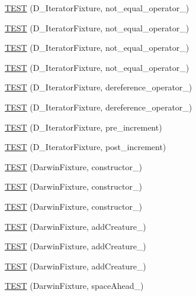 \begin{DoxyCompactItemize}
\hyperlink{TestDarwin_8c_09_09_a4ca9631924332f91c3eac38752aa2dbb}{T\-E\-S\-T} (D\-\_\-\-Iterator\-Fixture, not\-\_\-equal\-\_\-operator\-\_)
\item 
\hyperlink{TestDarwin_8c_09_09_afb0e646400ec1f41bac68701ca5c768e}{T\-E\-S\-T} (D\-\_\-\-Iterator\-Fixture, not\-\_\-equal\-\_\-operator\-\_)
\item 
\hyperlink{TestDarwin_8c_09_09_a0cf6e116e3a363d2aa2fa55cd4ae3d19}{T\-E\-S\-T} (D\-\_\-\-Iterator\-Fixture, not\-\_\-equal\-\_\-operator\-\_)
\item 
\hyperlink{TestDarwin_8c_09_09_a4f5676fe361894004b60c089ccb742b2}{T\-E\-S\-T} (D\-\_\-\-Iterator\-Fixture, not\-\_\-equal\-\_\-operator\-\_)
\item 
\hyperlink{TestDarwin_8c_09_09_afe0303ee7db146cdb59cdc7ae72387f6}{T\-E\-S\-T} (D\-\_\-\-Iterator\-Fixture, dereference\-\_\-operator\-\_)
\item 
\hyperlink{TestDarwin_8c_09_09_a4c890041b28c39e11ce70fa32b5501fe}{T\-E\-S\-T} (D\-\_\-\-Iterator\-Fixture, dereference\-\_\-operator\-\_)
\item 
\hyperlink{TestDarwin_8c_09_09_a4432c49a22d344f15a505c8415bc7b76}{T\-E\-S\-T} (D\-\_\-\-Iterator\-Fixture, pre\-\_\-increment)
\item 
\hyperlink{TestDarwin_8c_09_09_a6b8c3468ca273286905433dc449f6122}{T\-E\-S\-T} (D\-\_\-\-Iterator\-Fixture, post\-\_\-increment)
\item 
\hyperlink{TestDarwin_8c_09_09_a87a04a8e571bbf3095d43c11c3e7cf03}{T\-E\-S\-T} (Darwin\-Fixture, constructor\-\_)
\item 
\hyperlink{TestDarwin_8c_09_09_a16c8e4548c65cf74d494551e7acbf71a}{T\-E\-S\-T} (Darwin\-Fixture, constructor\-\_)
\item 
\hyperlink{TestDarwin_8c_09_09_ac6d935bbe356ddcea96a1c1080031197}{T\-E\-S\-T} (Darwin\-Fixture, constructor\-\_)
\item 
\hyperlink{TestDarwin_8c_09_09_ab782608979a8cf6a2aca6ce8ad20ce94}{T\-E\-S\-T} (Darwin\-Fixture, add\-Creature\-\_)
\item 
\hyperlink{TestDarwin_8c_09_09_a5dec9482706eb47cf80613def6ca0eac}{T\-E\-S\-T} (Darwin\-Fixture, add\-Creature\-\_)
\item 
\hyperlink{TestDarwin_8c_09_09_adc316ce896dcecaccefa6f72f5a5a724}{T\-E\-S\-T} (Darwin\-Fixture, add\-Creature\-\_)
\item 
\hyperlink{TestDarwin_8c_09_09_a731e3fde5a8dddd80792ee2ab6593cbd}{T\-E\-S\-T} (Darwin\-Fixture, space\-Ahead\-\_)
\item 

\end{DoxyCompactItemize}
